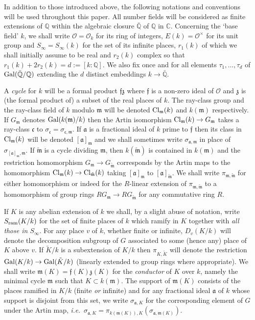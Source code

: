 \documentclass[12pt]{article}
\newcounter{rem}[section]%
\newcommand{\barbbQ}{\ensuremath{\bar{\bbQ}}}
\newcommand{\bbC}{\ensuremath{\mathbb{C}}}
\newcommand{\bbQ}{\ensuremath{\mathbb{Q}}}
\newcommand{\Cl}{{\rm Cl}}
\newcommand{\cO}{\ensuremath{\mathcal{O}}}
\newcommand{\fa}{\ensuremath{\mathfrak{a}}}
\newcommand{\fc}{\ensuremath{\mathfrak{c}}}
\newcommand{\ff}{\ensuremath{\mathfrak{f}}}
\newcommand{\fm}{\ensuremath{\mathfrak{m}}}
\newcommand{\fz}{\ensuremath{\mathfrak{z}}}
\newcommand{\Gal}{{\rm Gal}}
\newcommand{\ie}{\emph{i.e.}}
\newcommand{\rem}{\refstepcounter{rem}\noindent{\sc Remark \therem}}%
\renewcommand{\therem}{\thesection.\arabic{rem}}
\newcommand{\tfm}{\ensuremath{{\tilde{\fm}}}}
\begin{document}
In addition to those introduced above, the following
notations and conventions will be used throughout this paper.
All number fields will be considered
as finite extensions of $\bbQ$ within the algebraic closure $\barbbQ$ of $\bbQ$
in $\bbC$. Concerning the `base field' $k$, we shall write
$\cO=\cO_k$ for its ring of integers, $E(k)=\cO^\times$ for its unit group and
$S_\infty=S_\infty(k)$ for the set of its
infinite places, $r_1(k)$ of which we shall initially assume to be real and $r_2(k)$ complex
so that $r_1(k)+2r_2(k)=d:=[k:\bbQ]$. We also fix once and for all elements
$\tau_1,\ldots,\tau_d$ of $\Gal(\barbbQ/\bbQ)$ extending the $d$ distinct embeddings
$k\rightarrow\barbbQ$.

A \emph{cycle} for $k$ will be a formal product $\ff\fz$
where $\ff$ is a non-zero ideal of $\cO$ and $\fz$ is (the formal
product of) a subset of the real places of $k$. The ray-class
group and the ray-class field of $k$ modulo $\fm$ will be denoted
$\Cl_\fm(k)$
and $k(\fm)$ respectively. If $G_\fm$  denotes $\Gal(k(\fm)/k)$ then the Artin isomorphism
$\Cl_\fm(k)\rightarrow G_\fm$ takes a ray-class $\fc$ to $\sigma_{\fc}=\sigma_{\fc,\fm}$.
If $\fa$ is a fractional ideal of $k$ prime to $\ff$ then its class in $\Cl_\fm(k)$
will be denoted $[\fa]_\fm$ and we shall sometimes write $\sigma_{\fa,\fm}$ in place of
$\sigma_{[\fa]_\fm,\fm}$. If $\tfm$ is a cycle dividing $\fm$, then $k(\tfm)$ is contained in
$k(\fm)$ and the restriction homomorphism
$G_\fm\rightarrow G_\tfm$ corresponds by the Artin maps to the homomorphism
$\Cl_{\fm}(k)\rightarrow\Cl_\tfm(k)$ taking $[\fa]_\fm$ to
$[\fa]_\tfm$. We shall write $\pi_{\fm,\tfm}$ for either homomorphism or
indeed for the $R$-linear extension of $\pi_{\fm,\tfm}$ to a homomorphism of group rings
$R G_\fm\rightarrow R G_\tfm$ for any commutative ring $R$.

If $K$ is any abelian extension of $k$ we shall, by a slight abuse of notation,
write $S_{\rm ram}(K/k)$ for the set of finite places of
$k$ which ramify in $K$ together with \emph{all those in $S_\infty$}.
For any place $v$ of $k$, whether finite or infinite,
$D_v(K/k)$ will denote the decomposition subgroup of $G$
associated to some (hence any) place of $K$ above $v$.
If $\tilde{K}/k$ is a subextension of $K/k$ then $\pi_{K,\tilde{K}}$
will denote the restriction $\Gal(K/k)\rightarrow \Gal(\tilde{K}/k)$
(linearly extended to group rings where appropriate).
We shall write $\fm(K)=\ff(K)\fz(K)$ for the
\emph{conductor} of $K$ over $k$, namely the minimal cycle $\fm$ such that $K\subset k(\fm)$.
The support of $\fm(K)$ consists of the places ramified in $K/k$ (finite \emph{or} infinite)
and for any fractional ideal
$\fa$ of $k$ whose support is disjoint from this set, we write $\sigma_{\fa,K}$ for
the corresponding element of $G$ under the Artin map, \ie\
$\sigma_{\fa,K}=\pi_{k(\fm(K)),K}(\sigma_{\fa,\fm(K)})$.
\end{document}
